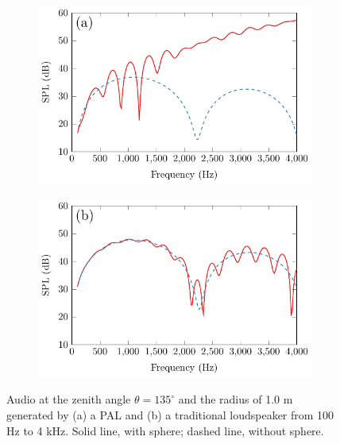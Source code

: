 \begin{figure}[!htb]
    \centering
    \begin{subfigure}{0.49\textwidth}
        \centering
        \includegraphics[width = \textwidth]{fig/PalSphereNoSphere_VaryFreq_211210W_211210X.pdf}
    \end{subfigure}
    \begin{subfigure}{0.49\textwidth}
        \centering
        \includegraphics[width = \textwidth]{fig/CircPistonSphereNoSphere_VaryFreq_211013Am.pdf}
    \end{subfigure}
    \caption{ Audio  at the zenith angle $\theta = 135^\circ$ and the radius of 1.0 m generated by (a) a PAL and (b) a traditional loudspeaker from 100 Hz to 4 kHz. 
    Solid line, with sphere; dashed line, without sphere.}
    \label{fig:scat_sim_with_without_sphere2}
\end{figure}

